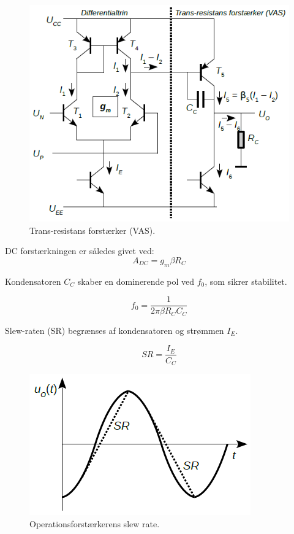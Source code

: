 \documentclass[danish]{article}
\begin{document}
\begin{figure} [H]
	\centering
	\includegraphics[width=0.9\linewidth]{graphics/vas}
	\caption{Trans-resistans forstærker (VAS).}
	\label{fig:VAS_forstærker}
\end{figure}
DC forstærkningen er således givet ved:
\begin{equation} 
A_{DC} = g_m \beta R_C
\end{equation}

Kondensatoren $C_C$ skaber en dominerende pol ved $f_0$, som sikrer stabilitet.

\begin{equation} 
f_0 = \dfrac{1}{2 \pi \beta R_C C_C}
\end{equation}

Slew-raten (SR) begrænses af kondensatoren og strømmen $I_E$.

\begin{equation} 
SR = \dfrac{I_E}{C_C}
\end{equation}

\begin{figure} [H]
	\centering
	\includegraphics[width=0.65\linewidth]{graphics/slewrate}
	\caption{Operationsforstærkerens slew rate.}
	\label{fig:slewrate}
\end{figure}
\end{document}
